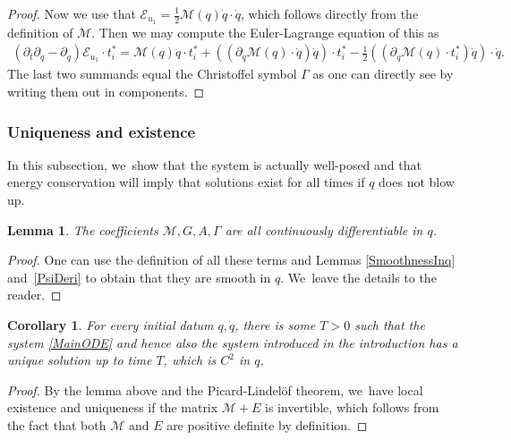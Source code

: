 \documentclass[JEP,XML,SOM,Unicode,published]{cedram}
\newtheorem{corollary}[theorem]{Corollary}
\newtheorem{lemma}[theorem]{Lemma}
\theoremstyle{definition}
\newcommand\eq{=}
\let\de\partial
\begin{document}
\begin{proof}
Now we use that $\mathcal{E}_{u_1}=\frac{1}{2}\mathcal{M}(q)\dot{q}\cdot\dot{q}$, which follows directly from the definition of $\mathcal{M}$. Then we may compute the Euler-Lagrange equation of this as
\begin{align*}
(\de_t\de_{\dot{q}}-\de_{q})\mathcal{E}_{u_1}\cdot t_i^*\eq \mathcal{M}(q)\ddot{q}\cdot t_i^*+((\de_q\mathcal{M}(q)\cdot \dot{q})\dot{q})\cdot t_i^*-\frac{1}{2}((\de_q\mathcal{M}(q)\cdot t_i^*)\dot{q})\cdot\dot{q}.
\end{align*}
The last two summands equal the Christoffel symbol $\Gamma$ as one can directly see by writing them out in components.
\end{proof}

\subsubsection{Uniqueness and existence}
In this subsection, we~show that the system is actually well-posed and that energy conservation will imply that solutions exist for all times if $q$ does not blow up.

\begin{lemma}
The coefficients $\mathcal{M},G,A, \Gamma$ are all continuously differentiable in $q$.
\end{lemma}
\begin{proof}
One can use the definition of all these terms and Lemmas \ref{SmoothnessInq} and~\ref{PsiDeri} to obtain that they are smooth in $q$. We~leave the details to the reader.
\end{proof}

\begin{corollary}
\label{Cor:Exist} For every initial datum $q,\dot{q}$, there is some $T>0$ such that the system \eqref{MainODE} and hence also the system introduced in the introduction has a unique solution up to time $T$, which is $C^2$ in $q$.
\end{corollary}
\begin{proof}
By the lemma above and the Picard-Lindelöf theorem, we~have local existence and uniqueness if the matrix $\mathcal{M}+E$ is invertible, which follows from the fact that both $\mathcal{M}$ and $E$ are positive definite by definition.
\end{proof}
\end{document}
